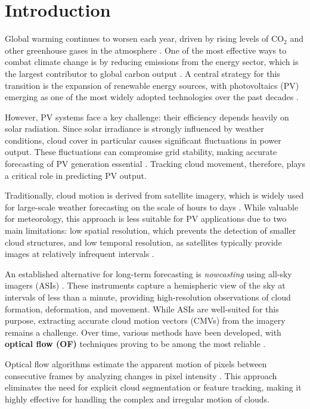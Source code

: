 \section{Introduction}

Global warming continues to worsen each year, driven by rising levels of CO$_2$ and other greenhouse gases in the atmosphere \cite{ipcc2023}. One of the most effective ways to combat climate change is by reducing emissions from the energy sector, which is the largest contributor to global carbon output \cite{iea2022}. A central strategy for this transition is the expansion of renewable energy sources, with photovoltaics (PV) emerging as one of the most widely adopted technologies over the past decades \cite{fraunhofer2021}.

However, PV systems face a key challenge: their efficiency depends heavily on solar radiation. Since solar irradiance is strongly influenced by weather conditions, cloud cover in particular causes significant fluctuations in power output. These fluctuations can compromise grid stability, making accurate forecasting of PV generation essential \cite{lorenz2009}. Tracking cloud movement, therefore, plays a critical role in predicting PV output.

Traditionally, cloud motion is derived from satellite imagery, which is widely used for large-scale weather forecasting on the scale of hours to days \cite{schmetz2002}. While valuable for meteorology, this approach is less suitable for PV applications due to two main limitations: low spatial resolution, which prevents the detection of smaller cloud structures, and low temporal resolution, as satellites typically provide images at relatively infrequent intervals \cite{hammer2003,inman2013}.

An established alternative for long-term forecasting is \textit{nowcasting} using all-sky imagers (ASIs) \cite{chow2011,kleissl2013}. These instruments capture a hemispheric view of the sky at intervals of less than a minute, providing high-resolution observations of cloud formation, deformation, and movement. While ASIs are well-suited for this purpose, extracting accurate cloud motion vectors (CMVs) from the imagery remains a challenge. Over time, various methods have been developed, with \textbf{optical flow (OF)} techniques proving to be among the most reliable \cite{urquhart2015}.

Optical flow algorithms estimate the apparent motion of pixels between consecutive frames by analyzing changes in pixel intensity \cite{horn1981determining}. This approach eliminates the need for explicit cloud segmentation or feature tracking, making it highly effective for handling the complex and irregular motion of clouds.

